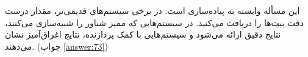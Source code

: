 \section{}
\paragraph{}\label{hint:94}
این مسأله وابسته به پیاده‌سازی است. در برخی سیستم‌های قدیمی‌تر، مقدار درست دقت بیت‌ها را دریافت می‌کنید. در سیستم‌هایی که ممیز شناور را شبیه‌سازی می‌کنند، نتایج دقیق ارائه می‌شود و سیستم‌هایی با کمک پردازنده، نتایج اغراق‌آمیز نشان می‌دهند. (جواب \ref{answer:73})